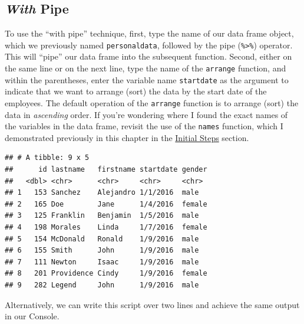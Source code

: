 \documentclass[]{book}
\newenvironment{Shaded}{\begin{snugshade}}{\end{snugshade}}
\newcommand{\KeywordTok}[1]{\textcolor[rgb]{0.13,0.29,0.53}{\textbf{#1}}}
\newcommand{\StringTok}[1]{\textcolor[rgb]{0.31,0.60,0.02}{#1}}
\newcommand{\CommentTok}[1]{\textcolor[rgb]{0.56,0.35,0.01}{\textit{#1}}}
\newcommand{\OperatorTok}[1]{\textcolor[rgb]{0.81,0.36,0.00}{\textbf{#1}}}
\newcommand{\NormalTok}[1]{#1}
\begin{document}
\hypertarget{opt1_arrange_withpipe}{\subsection{\texorpdfstring{\emph{With}
Pipe}{With Pipe}}\label{opt1_arrange_withpipe}}

To use the ``with pipe'' technique, first, type the name of our data
frame object, which we previously named \texttt{personaldata}, followed
by the pipe (\texttt{\%\textgreater{}\%}) operator. This will ``pipe''
our data frame into the subsequent function. Second, either on the same
line or on the next line, type the name of the \texttt{arrange}
function, and within the parentheses, enter the variable name
\texttt{startdate} as the argument to indicate that we want to arrange
(sort) the data by the start date of the employees. The default
operation of the \texttt{arrange} function is to arrange (sort) the data
in \emph{ascending} order. If you're wondering where I found the exact
names of the variables in the data frame, revisit the use of the
\texttt{names} function, which I demonstrated previously in this chapter
in the \protect\hyperlink{initsteps_arrange}{Initial Steps} section.

\begin{Shaded}
\end{Shaded}

\begin{verbatim}
## # A tibble: 9 x 5
##      id lastname   firstname startdate gender
##   <dbl> <chr>      <chr>     <chr>     <chr> 
## 1   153 Sanchez    Alejandro 1/1/2016  male  
## 2   165 Doe        Jane      1/4/2016  female
## 3   125 Franklin   Benjamin  1/5/2016  male  
## 4   198 Morales    Linda     1/7/2016  female
## 5   154 McDonald   Ronald    1/9/2016  male  
## 6   155 Smith      John      1/9/2016  male  
## 7   111 Newton     Isaac     1/9/2016  male  
## 8   201 Providence Cindy     1/9/2016  female
## 9   282 Legend     John      1/9/2016  male
\end{verbatim}

Alternatively, we can write this script over two lines and achieve the
same output in our Console.

\begin{Shaded}
\end{Shaded}
\end{document}
